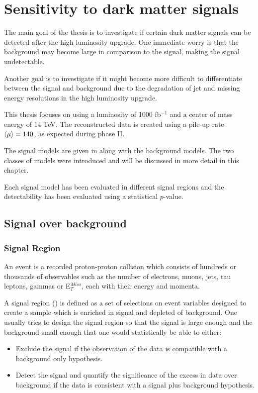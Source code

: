 \chapter{Sensitivity to dark matter signals}\label{cha:darkmatter}

The main goal of the thesis is to investigate if certain dark matter signals can be detected after the high luminosity upgrade. One immediate worry is that the background may become large in comparison to the signal, making the signal undetectable.

Another goal is to investigate if it might become more difficult to differentiate between the signal and background due to the degradation of jet and missing energy resolutions in the high luminosity upgrade.

This thesis focuses on using a luminosity of 1000 fb$^{-1}$ and a center of mass energy of 14 TeV. The reconstructed data is created using a pile-up rate $\left<\mu\right> = 140$, as expected during phase II.

The signal models are given in  along with the background models. The two classes of models were introduced  and will be discussed in more detail in this chapter.

Each signal model has been evaluated in different signal regions and the detectability has been evaluated using a statistical $p$-value. 

\newpage
\section{Signal over background}
\subsection{Signal Region}
An event is a recorded proton-proton collision which consists of hundreds or thousands of observables such as the number of electrons, muons, jets, tau leptons, gammas or E$^{Miss}_T$, each with their energy and momenta.

A signal region (\abbrSR) is defined as a set of selections on event variables designed to create a sample which is enriched in signal and depleted of background. One usually tries to design the signal region so that the signal is large enough and the background small enough that one would statistically be able to either:
\begin{itemize}
\item Exclude the signal if the observation of the data is compatible with a background only hypothesis.
\item Detect the signal and quantify the significance of the excess in data over background if the data is consistent with a signal plus background hypothesis.
\end{itemize}

